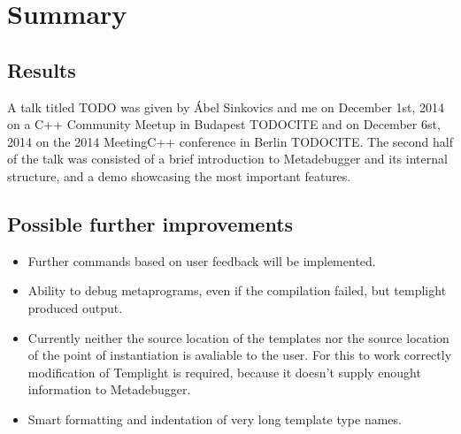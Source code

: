 
\chapter{Summary}

\section{Results}

A talk titled TODO was given by Ábel Sinkovics and me on December 1st, 2014 on
a C++ Community Meetup in Budapest TODOCITE and on December 6st, 2014 on the
2014 MeetingC++ conference in Berlin TODOCITE. The second half of the talk was
consisted of a brief introduction to Metadebugger and its internal structure,
and a demo showcasing the most important features.

\section{Possible further improvements}

\begin{itemize}
    \item
        Further commands based on user feedback will be implemented.
    \item
        Ability to debug metaprograms, even if the compilation failed, but
        templight produced output.
    \item
        Currently neither the source location of the templates nor the source
        location of the point of instantiation is avaliable to the user. For
        this to work correctly modification of Templight is required, because
        it doesn't supply enought information to Metadebugger.
    \item
        Smart formatting and indentation of very long template type names.
\end{itemize}

